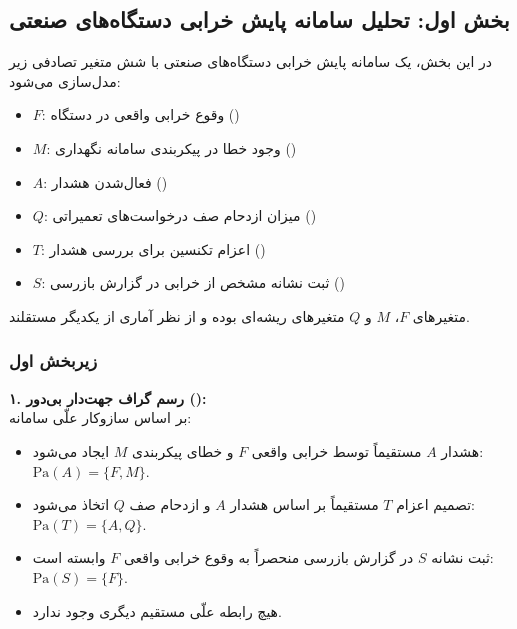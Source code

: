 \label{sec:question1}

\subsection{بخش اول: تحلیل سامانه پایش خرابی دستگاه‌های صنعتی}
\label{sec:q1-fault-system}

در این بخش، یک سامانه پایش خرابی دستگاه‌های صنعتی با شش متغیر تصادفی زیر مدل‌سازی می‌شود:
\begin{itemize}
  \item $F$: وقوع خرابی واقعی در دستگاه ()
  \item $M$: وجود خطا در پیکربندی سامانه نگهداری ()
  \item $A$: فعال‌شدن هشدار ()
  \item $Q$: میزان ازدحام صف درخواست‌های تعمیراتی ()
  \item $T$: اعزام تکنسین برای بررسی هشدار ()
  \item $S$: ثبت نشانه مشخص از خرابی در گزارش بازرسی ()
\end{itemize}
متغیرهای $F$، $M$ و $Q$ متغیرهای ریشه‌ای بوده و از نظر آماری از یکدیگر مستقلند.

\subsubsection{زیربخش اول}

\textbf{۱. رسم گراف جهت‌دار بی‌دور ():} \\
بر اساس سازوکار علّی سامانه:
\begin{itemize}
  \item هشدار $A$ مستقیماً توسط خرابی واقعی $F$ و خطای پیکربندی $M$ ایجاد می‌شود: $\mathrm{Pa}(A) = \{F, M\}$.
  \item تصمیم اعزام $T$ مستقیماً بر اساس هشدار $A$ و ازدحام صف $Q$ اتخاذ می‌شود: $\mathrm{Pa}(T) = \{A, Q\}$.
  \item ثبت نشانه $S$ در گزارش بازرسی منحصراً به وقوع خرابی واقعی $F$ وابسته است: $\mathrm{Pa}(S) = \{F\}$.
  \item هیچ رابطه علّی مستقیم دیگری وجود ندارد.
\end{itemize}

